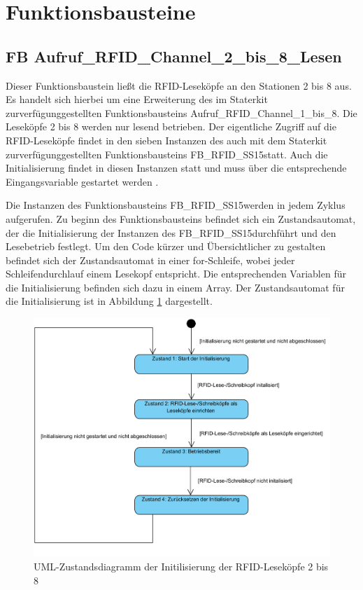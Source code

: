\section{Funktionsbausteine}\label{kap:FBs}

\subsection{FB Aufruf\_RFID\_Channel\_2\_bis\_8\_Lesen} \label{kap:FB_Lesen}
Dieser Funktionsbaustein ließt die RFID-Leseköpfe an den Stationen 2 bis 8 aus. Es handelt sich hierbei um eine Erweiterung des im Staterkit zurverfügunggestellten Funktionsbausteins \glqq Aufruf\_RFID\_Channel\_1\_bis\_8\grqq . Die Leseköpfe 2 bis 8 werden nur lesend betrieben. Der eigentliche Zugriff auf die RFID-Leseköpfe findet in den sieben Instanzen des auch mit dem Staterkit zurverfügunggestellten Funktionsbausteins \glqq FB\_RFID\_SS15\grqq  statt. Auch die Initialisierung findet in diesen Instanzen statt und muss über die entsprechende Eingangsvariable gestartet werden .

Die Instanzen des Funktionsbausteins \glqq FB\_RFID\_SS15\grqq  werden in jedem Zyklus aufgerufen. Zu beginn des Funktionsbausteins befindet sich ein Zustandsautomat, der die Initialisierung der Instanzen des  \glqq FB\_RFID\_SS15\grqq  durchführt und den Lesebetrieb festlegt. Um den Code kürzer und Übersichtlicher zu gestalten befindet sich der Zustandsautomat in einer for-Schleife, wobei jeder Schleifendurchlauf einem Lesekopf entspricht. Die entsprechenden Variablen für die Initialisierung befinden sich dazu in einem Array. Der Zustandsautomat für die Initialisierung ist in Abbildung \ref{fig:init_Leseköpfe} dargestellt.

\begin{figure}[h]
	    \centering
	    \includegraphics[width=0.7\linewidth]{Bilder/Zustandsdiagramme/RFID_lesen.png}
        \caption{UML-Zustandsdiagramm der Initilisierung der RFID-Leseköpfe 2 bis 8}
        \label{fig:init_Leseköpfe}
\end{figure}

